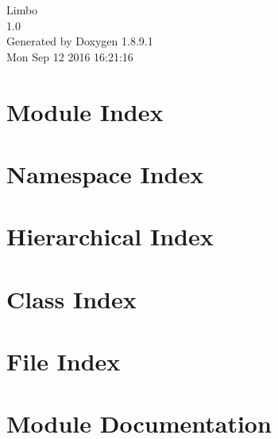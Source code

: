 \documentclass[twoside]{book}
\newcommand{\+}{\discretionary{\mbox{\scriptsize$\hookleftarrow$}}{}{}}
\newcommand{\clearemptydoublepage}{%
  \newpage{\pagestyle{empty}\cleardoublepage}%
}
\begin{document}
\hypersetup{pageanchor=false,
             bookmarks=true,
             bookmarksnumbered=true,
             pdfencoding=unicode
            }
\begin{titlepage}
\vspace*{7cm}
\begin{center}%
{\Large Limbo \\[1ex]\large 1.\+0 }\\
\vspace*{1cm}
{\large Generated by Doxygen 1.8.9.1}\\
\vspace*{0.5cm}
{\small Mon Sep 12 2016 16:21:16}\\
\end{center}
\end{titlepage}
\clearemptydoublepage
\tableofcontents
\clearemptydoublepage
{}
\hypersetup{pageanchor=true}

\chapter{Module Index}

\chapter{Namespace Index}

\chapter{Hierarchical Index}

\chapter{Class Index}

\chapter{File Index}

\chapter{Module Documentation}



















\end{document}
